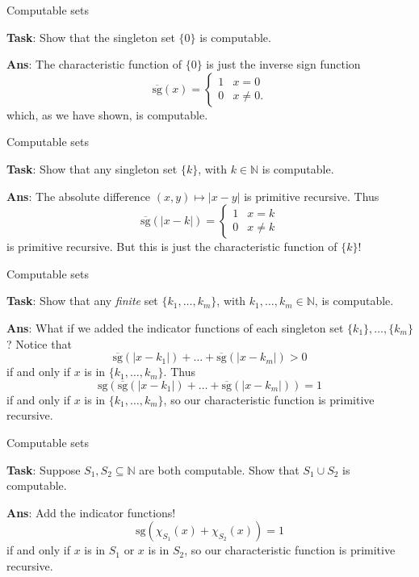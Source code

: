 \documentclass{beamer}
\newcommand{\N}{\mathbb N}
\begin{document}
\begin{frame}{Computable sets}

\textbf{Task}: Show that the singleton set $\{0\}$ is computable. \pause

\textbf{Ans}: The characteristic function of $\{0\}$ is just the inverse sign function
$$\overline{\mathrm{sg}}(x) = \begin{cases}
    1 & x = 0\\
    0 & x \neq 0.
    \end{cases}$$
which, as we have shown, is computable.
    
\end{frame}

\begin{frame}{Computable sets}

\textbf{Task}: Show that any singleton set $\{k\}$, with $k \in \N$ is computable. \pause

\textbf{Ans}: The absolute difference $(x, y) \mapsto |x - y|$ is primitive recursive. Thus
$$\overline{\mathrm{sg}}(|x - k|) = \begin{cases}
1 & x = k\\
0 & x \neq k
\end{cases}$$
is primitive recursive. But this is just the characteristic function of $\{k\}$!
    
\end{frame}

\begin{frame}{Computable sets}

\textbf{Task}: Show that any \textit{finite} set $\{k_1, \ldots, k_m\}$, with $k_1, \ldots, k_m \in \N$, is computable. \pause

\textbf{Ans}: What if we added the indicator functions of each singleton set $\{k_1\}, \ldots, \{k_m\}$? Notice that
$$
\overline{\mathrm{sg}}(|x - k_1|) + \ldots + \overline{\mathrm{sg}}(|x - k_m|) > 0 
$$
if and only if $x$ is in $\{k_1, \ldots, k_m\}$. Thus
$$
\mathrm{sg}(\overline{\mathrm{sg}}(|x - k_1|) + \ldots + \overline{\mathrm{sg}}(|x - k_m|)) = 1
$$
if and only if $x$ is in $\{k_1, \ldots, k_m\}$, so our characteristic function is primitive recursive.
    
\end{frame}

\begin{frame}{Computable sets}

\textbf{Task}: Suppose $S_1, S_2 \subseteq \N$ are both computable. Show that $S_1 \cup S_2$ is computable. \pause

\textbf{Ans}: Add the indicator functions!
$$
\mathrm{sg}(\chi_{S_1}(x) + \chi_{S_2}(x)) = 1
$$
if and only if $x$ is in $S_1$ or $x$ is in $S_2$, so our characteristic function is primitive recursive.
    
\end{frame}
\end{document}
